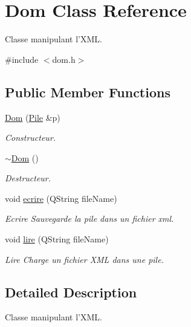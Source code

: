 \hypertarget{class_dom}{\section{Dom Class Reference}
\label{class_dom}
}


Classe manipulant l'X\-M\-L.  




{\ttfamily \#include $<$dom.\-h$>$}

\subsection*{Public Member Functions}
\begin{DoxyCompactItemize}
\item 
\hyperlink{class_dom_a76622d9817909851b9e7ba8a9b3d2614}{Dom} (\hyperlink{class_pile}{Pile} \&p)
\begin{DoxyCompactList}\small\item\em Constructeur. \end{DoxyCompactList}\item 
\hypertarget{class_dom_a5f1552721661519991b402047c661881}{\hyperlink{class_dom_a5f1552721661519991b402047c661881}{$\sim$\-Dom} ()}\label{class_dom_a5f1552721661519991b402047c661881}

\begin{DoxyCompactList}\small\item\em Destructeur. \end{DoxyCompactList}\item 
void \hyperlink{class_dom_a76e1a406daef8ed0e1bea3733575eb7f}{ecrire} (Q\-String file\-Name)
\begin{DoxyCompactList}\small\item\em Ecrire Sauvegarde la pile dans un fichier xml. \end{DoxyCompactList}\item 
void \hyperlink{class_dom_a0134557ad01388c484bb1661e1962ce1}{lire} (Q\-String file\-Name)
\begin{DoxyCompactList}\small\item\em Lire Charge un fichier X\-M\-L dans une pile. \end{DoxyCompactList}\end{DoxyCompactItemize}


\subsection{Detailed Description}
Classe manipulant l'X\-M\-L. 


